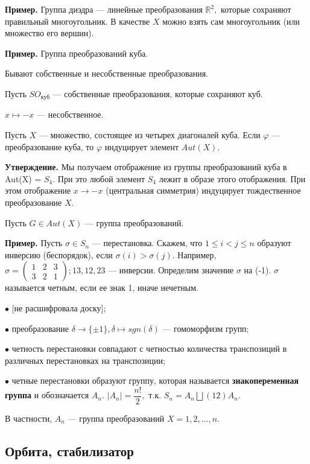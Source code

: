 \documentclass[12pt,a4paper]{article}
\begin{document}
\textbf{Пример.} Группа диэдра --- линейные преобразования $\mathbb{R}^{2},$ которые сохраняют правильный многоугольник. В качестве $X$ можно взять сам многоугольник (или множество его вершин). 

\textbf{Пример.} Группа преобразований куба.  

Бывают собственные и несобственные преобразования. 

Пусть $SO_{\text{куб}}$ --- собственные преобразования, которые сохраняют куб.

$x \mapsto -x$ --- несобственное. 

Пусть $X$ --- множество, состоящее из четырех диагоналей куба. Если $\varphi$ --- преобразование куба, то $\varphi$ индуцирует элемент $Aut(X).$ 

\textbf{Утверждение.} Мы получаем отображение из группы преобразований куба в Aut(X) = $S_{4}.$ При это любой элемент $S_{4}$ лежит в образе этого отображения. При этом отображение $x \to -x$ (центральная симметрия) индуцирует тождественное преобразование $X.$ 

Пусть $G \in Aut(X)$ --- группа преобразований. 

\textbf{Пример.} Пусть $\sigma \in S_{n}$ --- перестановка. Скажем, что $1 \leq i < j \leq n$ образуют инверсию (беспорядок), если $\sigma(i) > \sigma(j).$ Например, $\sigma = \begin{pmatrix}
1 & 2 & 3 \\
3 & 2 & 1
\end{pmatrix}; 13, 12, 23$ --- инверсии. Определим значение $\sigma$ на (-1). $\sigma$ называется четным, если ее знак 1, иначе нечетным. 

$\bullet$ [не расшифровала доску];

$\bullet$ преобразование $\delta \to \{\pm 1\}, \delta \mapsto sgn(\delta)$ --- гомоморфизм групп;

$\bullet$ четность перестановки совпадают с четностью количества транспозиций в различных перестановках на транспозиции;

$\bullet$ четные перестановки образуют группу, которая называется \textbf{знакопеременная группа} и обозначается $A_{n}.$ $|A_{n}| = \dfrac{n!}{2},$ т.к. $S_{n} = A_{n} \bigsqcup (12) A_{n}.$ 

В частности, $A_{n}$ --- группа преобразований $X = {1, 2, ..., n}.$ 

\subsection{Орбита, стабилизатор} 
\end{document}
